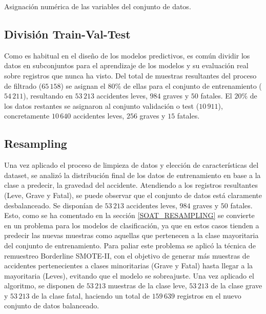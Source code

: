 \documentclass{uathesis-es}
\begin{document}
{\begin{table}[ht]
    \caption{Asignación numérica de las variables del conjunto de datos.}
    \label{TransformacionDatosTabla}
\end{table}


\subsection*{División Train-Val-Test}


Como es habitual en el diseño de los modelos predictivos, es común dividir los datos en subconjuntos para el aprendizaje de los modelos y su evaluación real sobre registros que nunca ha visto. Del total de muestras resultantes del proceso de filtrado ($65\,158$) se asignan el 80\% de ellas para el conjunto de entrenamiento ($54\,211$), resultando en $53\,213$ accidentes leves, $984$ graves y $50$ fatales. El $20\%$ de los datos restantes se asignaron al conjunto validación o test ($10\,911$), concretamente $10\,640$ accidentes leves, $256$ graves y $15$ fatales.


\subsection*{Resampling}

Una vez aplicado el proceso de limpieza de datos y elección de características del dataset, se analizó la distribución final de los datos de entrenamiento en base a la clase a predecir, la gravedad del accidente. Atendiendo a los registros resultantes (Leve, Grave y Fatal), se puede observar que el conjunto de datos está claramente desbalanceado. Se disponían de $53\,213$ accidentes leves, $984$ graves y $50$ fatales. Esto, como se ha comentado en la sección \ref{SOAT_RESAMPLING} se convierte en un problema para los modelos de clasificación, ya que en estos casos tienden a predecir las nuevas muestras como aquellas que pertenecen a la clase mayoritaria del conjunto de entrenamiento. Para paliar este problema se aplicó la técnica de remuestreo Borderline SMOTE-II, con el objetivo de generar más muestras de accidentes pertenecientes a clases minoritarias (Grave y Fatal) hasta llegar a la mayoritaria (Leves), evitando que el modelo se sobreajuste. Una vez aplicado el algoritmo, se disponen de $53\,213$ muestras de la clase leve, $53\,213$ de la clase grave y $53\,213$ de la clase fatal, haciendo un total de $159\,639$ registros en el nuevo conjunto de datos balanceado.

}
\end{document}
